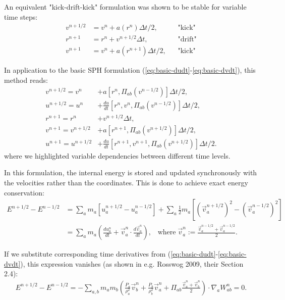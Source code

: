 \documentclass[notes.tex]{subfiles}
\begin{document}
An equivalent "kick-drift-kick" formulation was shown to be stable for
variable time steps:
\begin{align}
v^{n+1/2} &= v^n + a(r^{n}) \Delta t/2,  \;\;\; &\text{"kick"} \\
r^{n+1}   &= r^n + v^{n+1/2} \Delta t,   \;\;\; &\text{"drift"}\\
v^{n+1}   &= v^n + a(r^{n+1}) \Delta t/2,\;\;\; &\text{"kick"}
\end{align}

In application to the basic SPH formulation 
(\ref{eq:basic-dudt}-\ref{eq:basic-dvdt}), this method reads:
\begin{align}
v^{n+1/2} = v^n &+ a[r^{n},\Pi_{ab}(v^{n-1/2})] \Delta t/2, 
\label{eq:kick_v1}\\
u^{n+1/2} = u^n 
          &+ \frac{du}{dt}\left[r^n,v^n,\Pi_{ab}(v^{n-1/2})\right]\Delta t/2,
\label{eq:kick_u1}\\
r^{n+1} = r^n &+ v^{n+1/2} \Delta t,\\
v^{n+1} = v^{n+1/2} &+ a\left[r^{n+1},\Pi_{ab}(v^{n+1/2})\right] \Delta t/2, 
\label{eq:kick_v2}\\
u^{n+1} = u^{n+1/2} 
       &+ \frac{du}{dt}\left[r^{n+1},v^{n+1},\Pi_{ab}(v^{n+1/2})
                       \right]\Delta t/2.
\label{eq:kick_u2}                       
\end{align}
where we highlighted variable dependencies between different time levels.

In this formulation, the internal energy is stored and updated synchronously
with the velocities rather than the coordinates.
This is done to achieve exact energy conservation:
\begin{align}
  E^{n+1/2} - E^{n-1/2} 
   &=
     \sum_a m_a \left[u_a^{n+1/2} - u_a^{n-1/2}\right]
   + \sum_a \frac12 m_a \left[\left(\vec{v}^{n+1/2}_a\right)^2 
                      - \left(\vec{v}^{n-1/2}_a\right)^2\right] 
   \\                   
   &= \sum_a m_a\left(\frac{du^{n}_a}{dt} 
    + \vec{v}^{n}_a\cdot\frac{d\vec{v}^n_a}{dt}\right),
   \;\;\;
   \text{where}\;
   \vec{v}_a^n := \frac{\vec{v}_a^{n-1/2} + \vec{v}_a^{n-1/2}}2.
   \label{eq:vn}
\end{align}

If we substitute corresponding time derivatives from
(\ref{eq:basic-dudt}-\ref{eq:basic-dvdt}), this expression vanishes
(as shown in e.g. Rosswog 2009, their Section 2.4):
\begin{align}
 E^{n+1/2} - E^{n-1/2} = 
 -\sum_{a,b} m_a m_b \left(
        \frac{P_a}{\rho_a^2} \vec{v}^{n}_b
      + \frac{P_b}{\rho_b^2} \vec{v}^{n}_a
      + \Pi_{ab}\frac{\vec{v}^{n}_a + \vec{v}^{n}_b}{2}
    \right)\cdot\nabla_a W^{n}_{ab} = 0.
\label{eq:energy-cons}    
\end{align}
\end{document}
